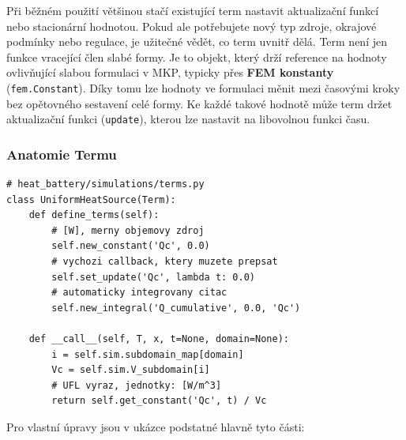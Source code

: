 \documentclass[a4paper,11pt]{article}
\begin{document}
Při běžném použití většinou stačí existující term nastavit aktualizační funkcí
nebo stacionární hodnotou. Pokud ale potřebujete nový typ zdroje, okrajové
podmínky nebo regulace, je užitečné vědět, co term uvnitř dělá. Term není jen
funkce vracející člen slabé formy. Je to objekt, který drží reference na hodnoty
ovlivňující slabou formulaci v MKP, typicky přes \textbf{FEM konstanty}
(\texttt{fem.Constant}). Díky tomu lze hodnoty ve formulaci měnit mezi časovými
kroky bez opětovného sestavení celé formy. Ke každé takové hodnotě může term
držet aktualizační funkci (\texttt{update}), kterou lze nastavit na libovolnou
funkci času.

\subsubsection*{Anatomie Termu}

\begin{lstlisting}[style=py]
# heat_battery/simulations/terms.py
class UniformHeatSource(Term):
    def define_terms(self):
        # [W], merny objemovy zdroj
        self.new_constant('Qc', 0.0)
        # vychozi callback, ktery muzete prepsat
        self.set_update('Qc', lambda t: 0.0)
        # automaticky integrovany citac
        self.new_integral('Q_cumulative', 0.0, 'Qc')

    def __call__(self, T, x, t=None, domain=None):
        i = self.sim.subdomain_map[domain]
        Vc = self.sim.V_subdomain[i]
        # UFL vyraz, jednotky: [W/m^3]
        return self.get_constant('Qc', t) / Vc
\end{lstlisting}

Pro vlastní úpravy jsou v ukázce podstatné hlavně tyto části:
\end{document}
